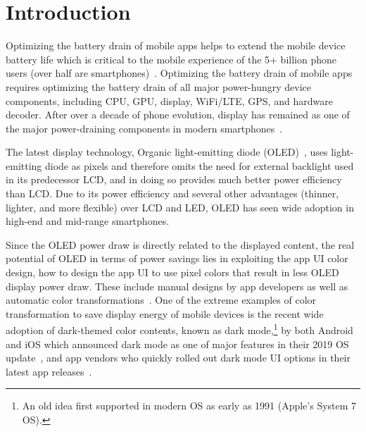 \vspace{-0.01in}

\section{Introduction}
\label{sec:intro}

Optimizing the battery drain of mobile apps helps to extend the
mobile device battery life which is critical to the mobile experience
of the 5+ billion phone users (over half are smartphones)~\cite{gsma2019}.
Optimizing the battery drain of mobile
apps requires optimizing the battery drain of all major power-hungry
device components, including CPU, GPU, display, WiFi/LTE,
GPS, and hardware decoder. After over a decade of phone evolution, display
has remained as one of the major power-draining components in modern
smartphones~\cite{dong2009current,dong:2011chameleon,chen:2013:display,wan:2017:displayenergy,chen:2016:dac,chan:2016:image,crayon:eurosys16}.

The latest display technology, Organic light-emitting diode (OLED)~\cite{oled:2003,oled:2004},
uses light-emitting diode as pixels and therefore omits the need for
external backlight used in its predecessor LCD, and in doing so
provides much better power efficiency than LCD.  Due to its power
efficiency and several other advantages (thinner, lighter, and more
flexible) over LCD and LED, OLED has seen wide adoption in high-end and mid-range
smartphones.

Since the OLED power draw is directly related to the displayed
content, the real potential of OLED in terms of power savings lies in
exploiting the app UI color design, \ie how to design the app UI 
to use pixel colors that result in less OLED display power draw.
These include manual designs by app developers as well as
automatic color transformations~\cite{dong:ispled09,dong:2011chameleon,crayon:eurosys16}.
One of the extreme examples of color transformation to save display energy of mobile
devices is the recent wide adoption of 
dark-themed color contents, known as dark mode,\footnote{An old idea first supported in modern OS as early as 1991 (Apple's System 7 OS).}
by both Android and iOS which announced dark mode as one of major
features in their 2019 OS
update~\cite{googledevsummit2018,appleaccouncedarkmode}, and app
vendors who quickly rolled out dark mode UI options in their latest
app releases~\cite{darkModeActicle1,darkModeActicle2,darkModeActicle3,darkModeActicle4,darkModeActicle5,darkModeActicle6,darkModeActicle7}.

